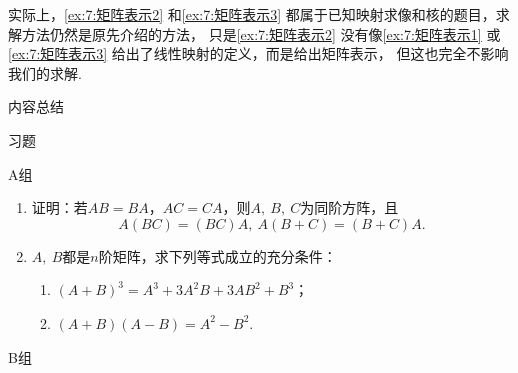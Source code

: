 实际上，\autoref{ex:7:矩阵表示2} 和\autoref{ex:7:矩阵表示3} 都属于已知映射求像和核的题目，求解方法仍然是原先介绍的方法，
只是\autoref*{ex:7:矩阵表示2} 没有像\autoref{ex:7:矩阵表示1} 或\autoref*{ex:7:矩阵表示3} 给出了线性映射的定义，而是给出矩阵表示，
但这也完全不影响我们的求解.

\vspace{2ex}
\centerline{\heiti \Large 内容总结}

\vspace{2ex}

\centerline{\heiti \Large 习题}
\vspace{2ex}
{\kaishu }
\begin{flushright}
    \kaishu

\end{flushright}
\centerline{\heiti A组}
\begin{enumerate}
    \item 证明：若$AB=BA$，$AC=CA$，则$A,\ B,\ C$为同阶方阵，且
	\[A(BC)=(BC)A,\ A(B+C)=(B+C)A.\]
	\item $A,\ B$都是$n$阶矩阵，求下列等式成立的充分条件：
	\begin{enumerate}
        \item $(A+B)^3=A^3+3A^2B+3AB^2+B^3$；
        \item $(A+B)(A-B)=A^2-B^2$.
    \end{enumerate}
\end{enumerate}
\centerline{\heiti B组}
